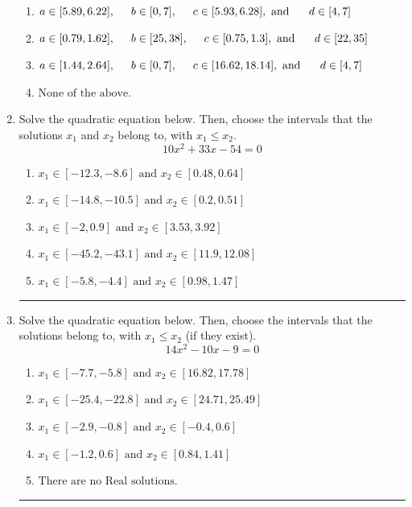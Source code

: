 \documentclass[14pt]{extbook}
\newcommand{\litem}[1]{\item#1\hspace*{-1cm}\rule{\textwidth}{0.4pt}}
\begin{document}
\begin{enumerate}
{\begin{enumerate}[label=\Alph*.]
\item \( a \in [5.89, 6.22], \hspace*{5mm} b \in [0, 7], \hspace*{5mm} c \in [5.93, 6.28], \text{ and } \hspace*{5mm} d \in [4, 7] \)
\item \( a \in [0.79, 1.62], \hspace*{5mm} b \in [25, 38], \hspace*{5mm} c \in [0.75, 1.3], \text{ and } \hspace*{5mm} d \in [22, 35] \)
\item \( a \in [1.44, 2.64], \hspace*{5mm} b \in [0, 7], \hspace*{5mm} c \in [16.62, 18.14], \text{ and } \hspace*{5mm} d \in [4, 7] \)
\item \( \text{None of the above.} \)

\end{enumerate} }
\litem{
Solve the quadratic equation below. Then, choose the intervals that the solutions $x_1$ and $x_2$ belong to, with $x_1 \leq x_2$.\[ 10x^{2} +33 x -54 = 0 \]\begin{enumerate}[label=\Alph*.]
\item \( x_1 \in [-12.3, -8.6] \text{ and } x_2 \in [0.48, 0.64] \)
\item \( x_1 \in [-14.8, -10.5] \text{ and } x_2 \in [0.2, 0.51] \)
\item \( x_1 \in [-2, 0.9] \text{ and } x_2 \in [3.53, 3.92] \)
\item \( x_1 \in [-45.2, -43.1] \text{ and } x_2 \in [11.9, 12.08] \)
\item \( x_1 \in [-5.8, -4.4] \text{ and } x_2 \in [0.98, 1.47] \)

\end{enumerate} }
\litem{
Solve the quadratic equation below. Then, choose the intervals that the solutions belong to, with $x_1 \leq x_2$ (if they exist).\[ 14x^{2} -10 x -9 = 0 \]\begin{enumerate}[label=\Alph*.]
\item \( x_1 \in [-7.7, -5.8] \text{ and } x_2 \in [16.82, 17.78] \)
\item \( x_1 \in [-25.4, -22.8] \text{ and } x_2 \in [24.71, 25.49] \)
\item \( x_1 \in [-2.9, -0.8] \text{ and } x_2 \in [-0.4, 0.6] \)
\item \( x_1 \in [-1.2, 0.6] \text{ and } x_2 \in [0.84, 1.41] \)
\item \( \text{There are no Real solutions.} \)


\end{enumerate}}
\end{enumerate}
\end{document}
